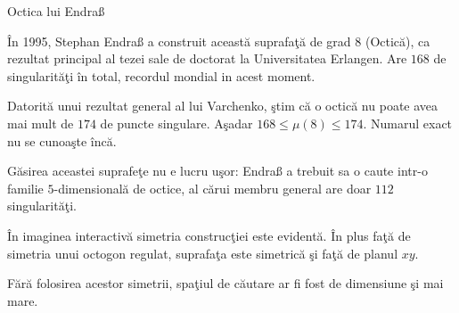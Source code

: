 \begin{surferPage}{Octica lui Endra\ss{} }

    \^{I}n 1995, Stephan Endra\ss{} a construit aceast\u{a} suprafa\c{t}\u{a} de grad $8$ (Octic\u{a}),
    ca rezultat principal al tezei sale de doctorat la Universitatea Erlangen. Are $168$ de
    singularit\u{a}\c{t}i \^{i}n total, recordul mondial in acest moment.

   Datorit\u{a} unui rezultat general al lui Varchenko, \c{s}tim c\u{a} o octic\u{a} nu poate avea mai mult
   de $174$ de puncte singulare. A\c{s}adar $168 \le \mu(8) \le 174$. Numarul exact nu se cunoa\c{s}te \^{i}nc\u{a}.

    G\u{a}sirea aceastei suprafe\c{t}e nu e lucru u\c{s}or: Endra\ss{} a trebuit sa o caute intr-o familie
    $5$-dimensional\u{a} de octice, al c\u{a}rui membru general are doar $112$ singularit\u{a}\c{t}i.


    \^{I}n imaginea interactiv\u{a} simetria construc\c{t}iei este evident\u{a}.
    \^{I}n plus fa\c{t}\u{a} de simetria unui octogon regulat, suprafa\c{t}a este simetric\u{a}
    \c{s}i fa\c{t}\u{a} de planul $xy$.

    F\u{a}r\u{a} folosirea acestor simetrii, spa\c{t}iul de c\u{a}utare ar fi fost de dimensiune \c{s}i mai mare.
\end{surferPage}
